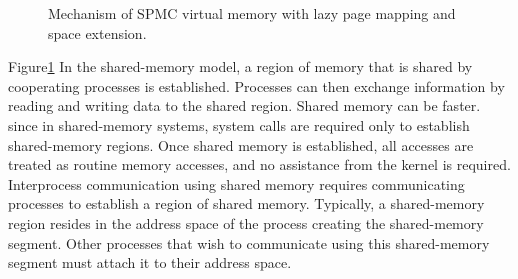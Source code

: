 \begin{figure}
\centering
\caption{Mechanism of SPMC virtual memory with lazy page mapping and space extension.}
\label{fig:dmr:spmc}
\end{figure}

Figure\ref{fig:dmr:spmc}
{\color{gray}
In the shared-memory model, a region of memory that is shared
by cooperating processes is established. 
Processes can then exchange information 
by reading and writing data to the shared region.
Shared memory can be faster.
since in shared-memory systems, system calls are required only to establish shared-memory regions. 
Once shared memory is established, all accesses are treated
as routine memory accesses, and no assistance from the kernel is required.
}
Interprocess communication using shared memory requires communicating
processes to establish a region of shared memory. Typically, a shared-memory
region resides in the address space of the process creating the shared-memory
segment. Other processes that wish to communicate using this shared-memory
segment must attach it to their address space. 

